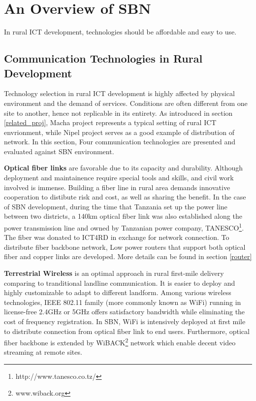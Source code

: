 \chapter{An Overview of SBN}
In rural ICT development, technologies should be affordable and easy to use.

\section{Communication Technologies in Rural Development}
Technology selection in rural ICT development is highly affected by physical environment and the demand of services. Conditions are often different from one site to another, hence not replicable in its entirety. As introduced in section \ref{related_proj}, Macha project represents a typical setting of rural ICT envrionment, while Nipel project serves as a good example of distribution of network. In this section, Four communication technologies are presented and evaluated against SBN environment.

\textbf{Optical fiber links} are favorable due to its capacity and durability. Although deployment and maintainence require special tools and skills, and civil work involved is immense. Building a fiber line in rural area demands innovative cooperation to distibute risk and cost, as well as sharing the benefit. In the case of SBN development, during the time that Tanzania set up the power line between two districts, a 140km optical fiber link was also established along the power transmission line and owned by Tanzanian power company, TANESCO\footnote{http://www.tanesco.co.tz/}. The fiber was donated to ICT4RD in exchange for network connection. To distribute fiber backbone network, Low power routers that support both optical fiber and copper links are developed. More details can be found in section \ref{router}

\textbf{Terrestrial Wireless} is an optimal approach in rural first-mile delivery comparing to tranditional landline communication. It is easier to deploy and highly customizable to adapt to different landform. Among various wireless technologies, IEEE 802.11 family (more commonly known as WiFi) running in license-free 2.4GHz or 5GHz offers satisfactory bandwidth while eliminating the cost of frequency registration. In SBN, WiFi is intensively deployed at first mile to distribute connection from optical fiber link to end users. Furthermore, optical fiber backbone is extended by WiBACK\footnote{www.wiback.org} network which enable decent video streaming at remote sites.

